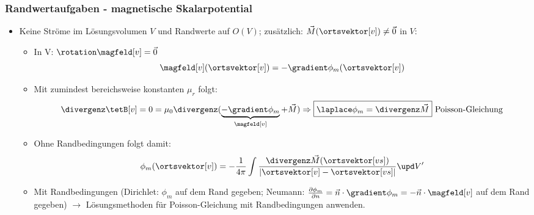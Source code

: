 \begin{frame}
  \frametitle{Randwertaufgaben - magnetische Skalarpotential}
  \begin{itemize}[<+->]
  \item Keine Ströme im Lösungsvolumen $V$ und Randwerte auf $O(V)$; \alert{zusätzlich:} $\vec{M}(\ortsvektor[v])\ne \vec{0}$ in $V$:
      \begin{itemize}[<+->]
      \item In V: $\rotation\magfeld[v] = \vec{0}$
        $$
        \magfeld[v](\ortsvektor[v]) = -\gradient \phi_m (\ortsvektor[v]) 
        $$
      \item Mit zumindest bereichsweise konstanten $\mu_r$ folgt:
        $$
        \divergenz \tetB[v] = 0 = \mu_0\divergenz ( \underbrace{-\gradient \phi_m }_{\magfeld[v]}+\vec{M}) \Rightarrow \boxed{\laplace \phi_m = \divergenz \vec{M}} \text{ Poisson-Gleichung}
        $$
      \item Ohne Randbedingungen folgt damit:
        $$
        \phi_m (\ortsvektor[v]) = -\frac{1}{4\pi} \int \frac{\divergenz \vec{M} (\ortsvektor[vs]) }{|\ortsvektor[v]-\ortsvektor[vs]|} \upd V'
        $$
        \item Mit Randbedingungen (Dirichlet: $\phi_m$ auf dem Rand gegeben; Neumann: $\frac{\partial\phi_m}{\partial n} = \vec{n}\cdot\gradient\phi_m = - \vec{n}\cdot\magfeld[v]$ auf dem Rand gegeben) $\to$ Lösungsmethoden für Poisson-Gleichung mit Randbedingungen anwenden.
\end{itemize}
\end{itemize}
\end{frame}




   

